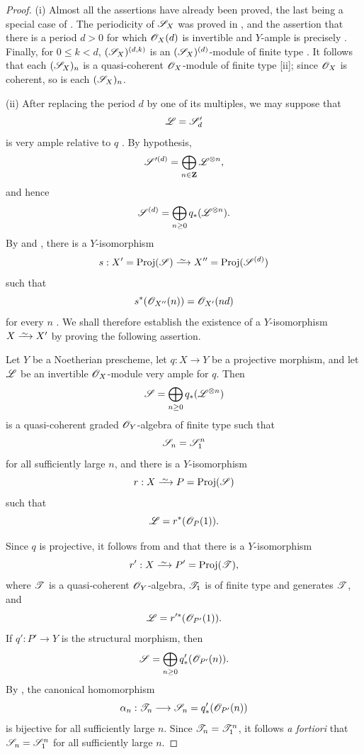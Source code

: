 \begin{proof}
(i) Almost all the assertions have already been proved, the last being a special case of .
The periodicity of $\mathscr{S}_X$ was proved in , and the assertion that there is a period $d>0$ for which $\mathscr{O}_X(d)$ is invertible and $Y$-ample is precisely .
Finally, for $0\leq k<d$, $(\mathscr{S}_X)^{(d,k)}$ is an $(\mathscr{S}_X)^{(d)}$-module of finite type .
It follows that each $(\mathscr{S}_X)_n$ is a quasi-coherent $\mathscr{O}_X$-module of finite type [ii]; since $\mathscr{O}_X$ is coherent, so is each $(\mathscr{S}_X)_n$.

(ii) After replacing the period $d$ by one of its multiples, we may suppose that
\[
  \mathscr{L}=\mathscr{S}'_d
\]
is very ample relative to $q$ .
By hypothesis,
\[
  \mathscr{S}'^{(d)}
  =\bigoplus_{n\in\mathbf{Z}}\mathscr{L}^{\otimes n},
\]
and hence
\[
  \mathscr{S}^{(d)}
  =\bigoplus_{n\geq0}q_*(\mathscr{L}^{\otimes n}).
\]
By  and , there is a $Y$-isomorphism
\[
  s:X'=\Proj(\sh{S})\simto
  X''=\Proj(\sh{S}^{(d)})
\]
such that
\[
  s^*(\mathscr{O}_{X''}(n))=\mathscr{O}_{X'}(nd)
\]
for every $n$ .
We shall therefore establish the existence of a $Y$-isomorphism $X\simto X'$ by proving the following assertion.

\begin{env}[2.3.4.1]
\label{III.2.3.4.1}
Let $Y$ be a Noetherian prescheme, let $q:X\to Y$ be a projective morphism, and let $\mathscr{L}$ be an invertible $\mathscr{O}_X$-module very ample for $q$.
Then
\[
  \mathscr{S}=\bigoplus_{n\geq0}q_*(\mathscr{L}^{\otimes n})
\]
is a quasi-coherent graded $\mathscr{O}_Y$-algebra of finite type such that
\[
  \mathscr{S}_n=\mathscr{S}_1^n
\]
for all sufficiently large $n$, and there is a $Y$-isomorphism
\[
  r:X\simto P=\Proj(\sh{S})
\]
such that
\[
  \mathscr{L}=r^*(\mathscr{O}_P(1)).
\]
\end{env}

Since $q$ is projective, it follows from  and  that there is a $Y$-isomorphism
\[
  r':X\simto P'=\Proj(\sh{T}),
\]
where $\mathscr{T}$ is a quasi-coherent $\mathscr{O}_Y$-algebra, $\mathscr{T}_1$ is of finite type and generates $\mathscr{T}$, and
\[
  \mathscr{L}=r'^*(\mathscr{O}_{P'}(1)).
\]
If $q':P'\to Y$ is the structural morphism, then
\[
  \mathscr{S}=\bigoplus_{n\geq0}q'_*(\mathscr{O}_{P'}(n)).
\]
By , the canonical homomorphism
\[
  \alpha_n:\mathscr{T}_n\longrightarrow
  \mathscr{S}_n=q'_*(\mathscr{O}_{P'}(n))
\]
is bijective for all sufficiently large $n$.
Since $\mathscr{T}_n=\mathscr{T}_1^n$, it follows \emph{a fortiori} that $\mathscr{S}_n=\mathscr{S}_1^n$ for all sufficiently large $n$.


\end{proof}
